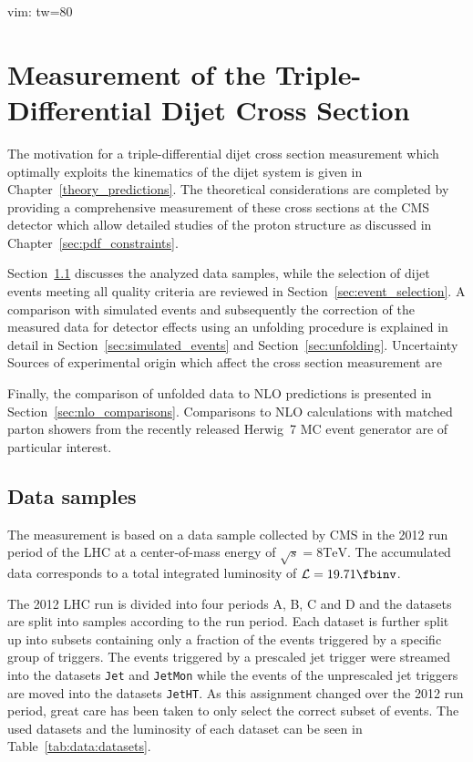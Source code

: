  vim: tw=80

\chapter{Measurement of the Triple-Differential Dijet Cross Section}
\label{sec:measurement}

The motivation for a triple-differential dijet cross section measurement which
optimally exploits the kinematics of the dijet system is given in
Chapter~\ref{theory_predictions}. The theoretical considerations are completed
by providing a comprehensive measurement of these cross sections at the CMS
detector which allow detailed studies of the proton structure as discussed in
Chapter~\ref{sec:pdf_constraints}. 

Section~\ref{sec:datasets} discusses the
analyzed data samples, while the selection of dijet events meeting all quality
criteria are reviewed in Section~\ref{sec:event_selection}. A comparison with
simulated events and subsequently the correction of the measured data for
detector effects using an unfolding procedure is explained in detail in
Section~\ref{sec:simulated_events} and Section~\ref{sec:unfolding}. Uncertainty
Sources of experimental origin which affect the cross section measurement are

Finally, the comparison of unfolded data to NLO predictions is presented in
Section~\ref{sec:nlo_comparisons}. Comparisons to NLO calculations with matched
parton showers from the recently released Herwig~7 MC event generator are of
particular interest.

\section{Data samples}
\label{sec:datasets}

The measurement is based on a data sample collected by CMS in the 2012 run
period of the LHC at a center-of-mass energy of $\sqrt{s} = 8 \si{\TeV}$. The
accumulated data corresponds to a total integrated luminosity of $\mathcal{L} =
19.71 \si{\fbinv}$. 

The 2012 LHC run is divided into four periods A, B, C and D and the datasets are
split into samples according to the run period. Each dataset is further split up
into subsets containing only a fraction of the events triggered by a specific
group of triggers. The events triggered by a prescaled jet trigger were streamed
into the datasets \texttt{Jet} and \texttt{JetMon} while the events of the
unprescaled jet triggers are moved into the datasets \texttt{JetHT}. As this
assignment changed over the 2012 run period, great care has been taken to only
select the correct subset of events. The used datasets and the luminosity of
each dataset can be seen in Table~\ref{tab:data:datasets}.

